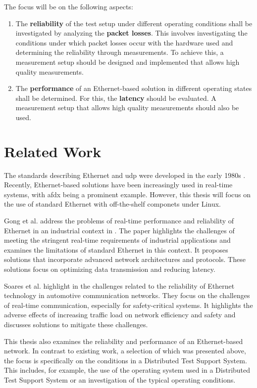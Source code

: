  The focus will be on the following aspects:

\begin{enumerate}[label=\arabic*.]
    \item The \textbf{reliability} of the test setup under different operating conditions shall be investigated by analyzing the \textbf{packet losses}. This involves investigating the conditions under which packet losses occur with the hardware used and determining the reliability through measurements. To achieve this, a measurement setup should be designed and implemented that allows high quality measurements.
    \item The \textbf{performance} of an Ethernet-based solution in different operating states shall be determined. For this, the \textbf{latency} should be evaluated. A measurement setup that allows high quality measurements should also be used.
\end{enumerate}


\section{Related Work} \label{chap:introduction:related_work}
The standards describing Ethernet and \ac{udp} were developed in the early 1980s \cite{introRelW04}. Recently, Ethernet-based solutions have been increasingly used in real-time systems, with \ac{afdx} being a prominent example. However, this thesis will focus on the use of standard Ethernet with off-the-shelf componets under Linux.

Gong et al. address the problems of real-time performance and reliability of Ethernet in an industrial context in \cite{introRelW02}. The paper highlights the challenges of meeting the stringent real-time requirements of industrial applications and examines the limitations of standard Ethernet in this context. It proposes solutions that incorporate advanced network architectures and protocols. These solutions focus on optimizing data transmission and reducing latency.

Soares et al. highlight in \cite{introRelW03} the challenges related to the reliability of Ethernet technology in automotive communication networks. They focus on the challenges of real-time communication, especially for safety-critical systems. It highlights the adverse effects of increasing traffic load on network efficiency and safety and discusses solutions to mitigate these challenges.

This thesis also examines the reliability and performance of an Ethernet-based network. In contrast to existing work, a selection of which was presented above, the focus is specifically on the conditions in a Distributed Test Support System. This includes, for example, the use of the operating system used in a Distributed Test Support System or an investigation of the typical operating conditions.